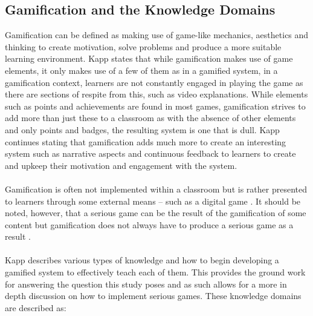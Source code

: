 \documentclass[conference]{IEEEtran}
\begin{document}
\subsection{Gamification and the Knowledge Domains}
Gamification can be defined as making use of game-like mechanics, aesthetics and thinking to create motivation, solve problems and produce a more suitable learning environment\cite{Kapp2012a}. Kapp\cite{KappArticle2012} states that while gamification makes use of game elements, it only makes use of a few of them as in a gamified system, in a gamification context, learners are not constantly engaged in playing the game as there are sections of respite from this, such as video explanations. While elements such as points and achievements are found in most games, gamification strives to add more than just these to a classroom as with the absence of other elements and only points and badges, the resulting system is one that is dull\cite{KappArticle2012}. Kapp\cite{KappArticle2012} continues stating that gamification adds much more to create an interesting system such as narrative aspects and continuous feedback to learners to create and upkeep their motivation and engagement with the system.
\\\\
Gamification is often not implemented within a classroom but is rather presented to learners through some external means – such as a digital game \cite{KappArticle2012}. It should be noted, however, that a serious game can be the result of the gamification of some content but gamification does not always have to produce a serious game as a result \cite{KappArticle2012}.  
\\\\
Kapp\cite{Kapp2012a} describes various types of knowledge and how to begin developing a gamified system to effectively teach each of them. This provides the ground work for answering the question this study poses and as such allows for a more in depth discussion on how to implement serious games. These knowledge domains are described as\cite{Kapp2012a}:
\end{document}
